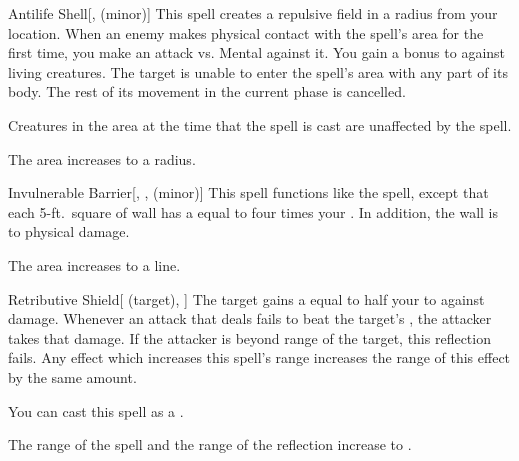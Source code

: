 \lowercase{\hypertarget{spell:Antilife Shell}{}}\label{spell:Antilife Shell}
\begin{freeability}[Rank 6]{\hypertarget{spell:Antilife Shell}{Antilife Shell}}[,  (minor)]
This spell creates a repulsive field in a \areamed radius  from your location.
When an enemy makes physical contact with the spell's area for the first time, you make an attack vs. Mental against it.
You gain a  bonus to  against living creatures.
\hit The target is unable to enter the spell's area with any part of its body.
The rest of its movement in the current phase is cancelled.

Creatures in the area at the time that the spell is cast are unaffected by the spell.

\rankline
{} The area increases to a \arealarge radius.

\end{freeability}
\vspace{0.25em}



\lowercase{\hypertarget{spell:Invulnerable Barrier}{}}\label{spell:Invulnerable Barrier}
\begin{freeability}[Rank 6]{\hypertarget{spell:Invulnerable Barrier}{Invulnerable Barrier}}[, ,  (minor)]
\targetrule
This spell functions like the  spell, except that each 5-ft.\ square of wall has a  equal to four times your .
In addition, the wall is  to physical damage.

\rankline
{} The area increases to a \arealarge line.

\end{freeability}
\vspace{0.25em}



\lowercase{\hypertarget{spell:Retributive Shield}{}}\label{spell:Retributive Shield}
\begin{attuneability}[Rank 6]{\hypertarget{spell:Retributive Shield}{Retributive Shield}}[ (target), ]
The target gains a  equal to half your  to  against  damage.
Whenever an attack that deals  fails to beat the target's , the attacker takes that damage.
If the attacker is beyond \rngclose range of the target, this reflection fails.
Any effect which increases this spell's range increases the range of this effect by the same amount.

You can cast this spell as a .

\rankline
{} The range of the spell and the range of the reflection increase to \rngmed.

\end{attuneability}
\vspace{0.25em}



